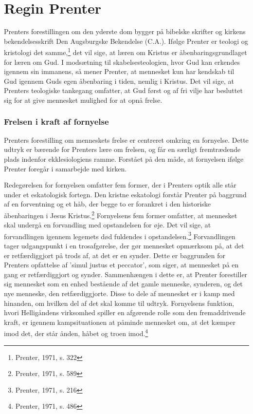 \section{Regin Prenter}
Prenters forestillingen om den yderste dom bygger på bibelske skrifter og kirkens bekendelsesskrift Den Augsburgske Bekendelse (C.A.). Ifølge Prenter er teologi og kristologi det samme,\footnote{Prenter, 1971, s. 322} det vil sige, at læren om Kristus er åbenbaringsgrundlaget for læren om Gud. I modsætning til skabelsesteologien, hvor Gud kan erkendes igennem sin immanens, så mener Prenter, at mennesket kun har kendskab til Gud igennem Guds egen åbenbaring i tiden, nemlig i Kristus. Det vil sige, at Prenters teologiske tankegang omfatter, at Gud først og af fri vilje har besluttet sig for at give mennesket mulighed for at opnå frelse.

\subsubsection{Frelsen i kraft af fornyelse}
Prenters forestilling om menneskets frelse er centreret omkring en fornyelse. Dette udtryk er bærende for Prenters lære om frelsen, og får en særligt fremtrædende plads indenfor ekklesiologiens ramme. Forstået på den måde, at fornyelsen ifølge Prenter foregår i samarbejde med kirken.

Redegørelsen for fornyelsen omfatter fem former, der i Prenters optik alle står under et eskatologisk fortegn. Den kristne eskatologi forstår Prenter på baggrund af en forventning og et håb, der begge to er forankret i den historiske åbenbaringen i Jesus Kristus.\footnote{Prenter, 1971, s. 589} Fornyelsens fem former omfatter, at mennesket skal undergå en forvandling med opstandelsen for øje. Det vil sige, at forvandlingen igennem legemets død fuldendes i opstandelsen.\footnote{Prenter, 1971, s. 216} Forvandlingen tager udgangspunkt i en trosafgørelse, der gør mennesket opmærksom på, at det er retfærdiggjort på trods af, at det er en synder. Dette er baggrunden for Prenters opfattelse af 'simul justus et peccator', som siger, at mennesket på en gang er retfærdiggjort og synder. Sammenhængen i dette er, at Prenter forestiller sig mennesket som en enhed bestående af det gamle menneske, synderen, og det nye menneske, den retfærdiggjorte. Disse to dele af mennesket er i kamp med hinanden, om hvilken del af det skal komme til udtryk. Fornyelsens funktion, hvori Helligåndens virksomhed spiller en afgørende rolle som den fremaddrivende kraft, er igennem kampsituationen at påminde mennesket om, at det kæmper imod det, der står ånden, håbet og troen imod.\footnote{Prenter, 1971, s. 486}

